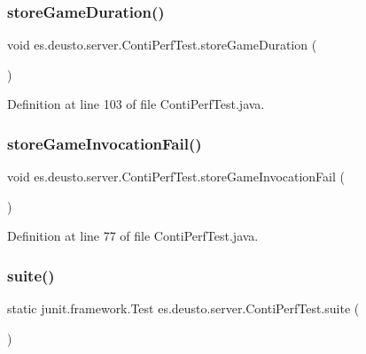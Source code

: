 \subsubsection{\texorpdfstring{store\+Game\+Duration()}{storeGameDuration()}}
{\footnotesize\ttfamily void es.\+deusto.\+server.\+Conti\+Perf\+Test.\+store\+Game\+Duration (\begin{DoxyParamCaption}{ }\end{DoxyParamCaption})}



Definition at line 103 of file Conti\+Perf\+Test.\+java.

\mbox{\label{classes_1_1deusto_1_1server_1_1_conti_perf_test_ae0b0bd4dc05c61facbe80fac922ecdfa}} 
\subsubsection{\texorpdfstring{store\+Game\+Invocation\+Fail()}{storeGameInvocationFail()}}
{\footnotesize\ttfamily void es.\+deusto.\+server.\+Conti\+Perf\+Test.\+store\+Game\+Invocation\+Fail (\begin{DoxyParamCaption}{ }\end{DoxyParamCaption})}



Definition at line 77 of file Conti\+Perf\+Test.\+java.

\mbox{\label{classes_1_1deusto_1_1server_1_1_conti_perf_test_abe1f2e0ee16352a969c96e46dd35d770}} 
\subsubsection{\texorpdfstring{suite()}{suite()}}
{\footnotesize\ttfamily static junit.\+framework.\+Test es.\+deusto.\+server.\+Conti\+Perf\+Test.\+suite (\begin{DoxyParamCaption}{ }\end{DoxyParamCaption})\hspace{0.3cm}{\ttfamily [static]}}



